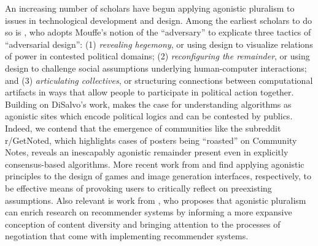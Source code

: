 An increasing number of scholars have begun applying agonistic pluralism to issues in technological development and design. Among the earliest scholars to do so is \citet{DiSalvo2012AdversarialDesign}, who adopts Mouffe's notion of the ``adversary'' to explicate three tactics of ``adversarial design'': (1) \textit{revealing hegemony}, or using design to visualize relations of power in contested political domains; (2) \textit{reconfiguring the remainder}, or using design to challenge social assumptions underlying human-computer interactions; and (3) \textit{articulating collectives}, or structuring connections between computational artifacts in ways that allow people to participate in political action together. Building on DiSalvo's work, \citet{Crawford2016CanAnAlgorithmBeAgonistic} makes the case for understanding algorithms as agonistic sites which encode political logics and can be contested by publics.
Indeed, we contend that the emergence of communities like the subreddit r/GetNoted, which highlights cases of posters being ``roasted'' on Community Notes, reveals an inescapably agonistic remainder present even in explicitly consensus-based algorithms. More recent work from \citet{Angelietal2021UnsettlingPlay} and \citet{Shawetal2025AgonisticImageGeneration} find applying agonistic principles to the design of games and image generation interfaces, respectively, to be effective means of provoking users to critically reflect on preexisting assumptions. Also relevant is work from \citet{Sax2022AlgorithmicNewsDiversity}, who proposes that agonistic pluralism can enrich research on recommender systems by informing a more expansive conception of content diversity and bringing attention to the processes of negotiation that come with implementing recommender systems.

